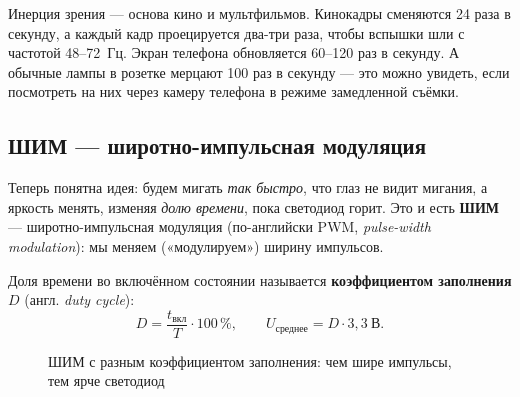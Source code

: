 \begin{fact}
Инерция зрения --- основа кино и мультфильмов. Кинокадры сменяются 24 раза в секунду, а каждый кадр
проецируется два-три раза, чтобы вспышки шли с частотой 48--72~Гц. Экран телефона обновляется
60--120 раз в секунду. А обычные лампы в розетке мерцают 100 раз в секунду --- это можно увидеть,
если посмотреть на них через камеру телефона в режиме замедленной съёмки.
\end{fact}

\subsection{ШИМ --- широтно-импульсная модуляция}

Теперь понятна идея: будем мигать \emph{так быстро}, что глаз не видит мигания, а яркость менять,
изменяя \emph{долю времени}, пока светодиод горит. Это и есть \textbf{ШИМ} --- широтно-импульсная
модуляция (по-английски PWM, \emph{pulse-width modulation}): мы меняем («модулируем») ширину импульсов.

Доля времени во включённом состоянии называется \textbf{коэффициентом заполнения} $D$ (англ. \emph{duty cycle}):
\[
  D = \frac{t_\text{вкл}}{T}\cdot 100\,\%, \qquad U_\text{среднее} = D \cdot 3{,}3~\text{В}.
\]

\begin{figure}[H]
\centering
{}
\caption{ШИМ с разным коэффициентом заполнения: чем шире импульсы, тем ярче светодиод}
\end{figure}

